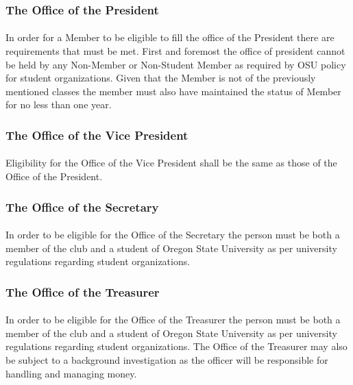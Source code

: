 \documentclass[12pt]{article}
\begin{document}
\subsubsection{The Office of the President}
\paragraph{}
In order for a Member to be eligible to fill the office of the President there are requirements that must be met. First and foremost the office of president cannot be held by any Non-Member or Non-Student Member as required by OSU policy for student organizations. Given that the Member is not of the previously mentioned classes the member must also have maintained the status of Member for no less than one year. 

\subsubsection{The Office of the Vice President}
\paragraph{}
Eligibility for the Office of the Vice President shall be the same as those of the Office of the President.

\subsubsection{The Office of the Secretary}
\paragraph{}
In order to be eligible for the Office of the Secretary the person must be both a member of the club and a student of Oregon State University as per university regulations regarding student organizations.

\subsubsection{The Office of the Treasurer}
\paragraph{}
In order to be eligible for the Office of the Treasurer the person must be both a member of the club and a student of Oregon State University as per university regulations regarding student organizations.
The Office of the Treasurer may also be subject to a background investigation as the officer will be responsible for handling and managing money.
\end{document}
